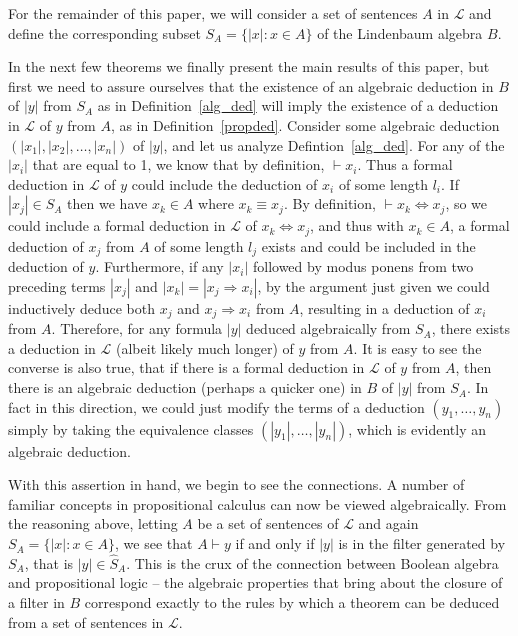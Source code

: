 \documentclass[11pt,titlepage]{article}
\newcommand{\imp}{\Rightarrow}
\newcommand{\ifff}{\Leftrightarrow}
\newcommand{\Lan}{\mathcal{L}}
\theoremstyle{definition}
\begin{document}
For the remainder of this paper, we will consider a set of sentences $A$ in $\Lan$ and define the corresponding subset $S_A=\{|x| : x\in A\}$ of the Lindenbaum algebra $B$.

In the next few theorems we finally present the main results of this paper, but first we need to assure ourselves that the existence of an algebraic deduction in $B$ of $|y|$ from $S_A$ as in Definition~\ref{alg_ded} will imply the existence of a deduction in $\Lan$ of $y$ from $A$, as in Definition~\ref{propded}.  Consider some algebraic deduction $(|x_1|, |x_2|,\ldots, |x_n|)$ of $|y|$, and let us analyze Defintion~\ref{alg_ded}. For any of the $|x_i|$ that are equal to 1, we know that by definition, $\vdash x_i$. Thus a formal deduction in $\Lan$ of $y$ could include the deduction of $x_i$ of some length $l_i$. If $|x_j| \in S_A$ then we have $x_k \in A$ where $x_k\equiv x_j.$ By definition, $\vdash x_k\ifff x_j$, so we could include a formal deduction in $\Lan$ of $x_k\ifff x_j$, and thus with $x_k\in A$, a formal deduction of $x_j$ from $A$ of some length $l_j$ exists and could be included in the deduction of $y$. Furthermore, if any $|x_i|$ followed by modus ponens  from two preceding terms $|x_j|$ and $|x_k|=|x_j \imp x_i|$, by the argument just given we could inductively deduce both $x_j$ and $x_j\imp x_i$ from $A$, resulting in a deduction of $x_i$ from $A$. Therefore, for any formula $|y|$ deduced algebraically from $S_A$, there exists a deduction in $\Lan$ (albeit likely much longer) of $y$ from $A$. It is easy to see the converse is also true, that if there is a formal deduction in $\Lan$ of $y$ from $A$, then there is an algebraic deduction (perhaps a quicker one) in $B$ of $|y|$ from $S_A$. In fact in this direction, we could just modify the terms of a deduction $(y_1,\ldots,y_n)$ simply by taking the equivalence classes $(|y_1|,\ldots,|y_n|)$, which is evidently an algebraic deduction.

With this assertion in hand, we begin to see the connections. A number of familiar concepts in propositional calculus can now be viewed algebraically. From the reasoning above, letting $A$ be a set of sentences of $\Lan$ and again $S_A=\{|x| : x\in A\}$, we see that $A\vdash y$ if and only if $|y|$ is in the filter generated by $S_A$, that is $|y|\in\hat{S}_A$. This is the crux of the connection between Boolean algebra and propositional logic -- the algebraic properties that bring about the closure of a filter in $B$ correspond exactly to the rules by which a theorem can be deduced from a set of sentences in $\Lan$. 
\end{document}
